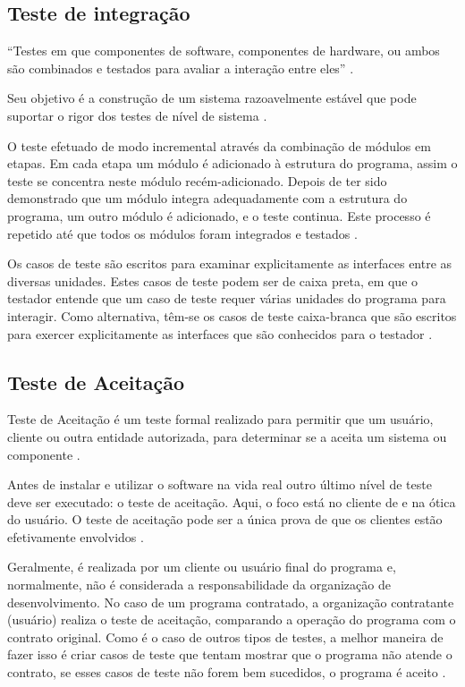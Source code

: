 \subsection{Teste de integração}

“Testes em que componentes de software, componentes de hardware, ou ambos são combinados e testados para avaliar a interação entre eles” \cite{ieee}.

Seu objetivo é a construção de um sistema razoavelmente estável que pode suportar o rigor dos testes de nível de sistema \cite[pág.~18]{naik2008}.

O teste  efetuado de modo incremental através da combinação de módulos em etapas. Em cada etapa um módulo é adicionado à estrutura do programa, assim o teste se concentra neste módulo recém-adicionado. Depois de ter sido demonstrado que um módulo integra adequadamente com a estrutura do programa, um outro módulo é adicionado, e o teste continua. Este processo é repetido até que todos os módulos foram integrados e testados \cite[pág.~134]{lewis2009}.

Os casos de teste são escritos para examinar explicitamente as interfaces entre as diversas unidades. Estes casos de teste podem ser de caixa preta, em que o testador entende que um caso de teste requer várias unidades do programa para interagir. Como alternativa, têm-se os casos de teste caixa-branca que são escritos para exercer explicitamente as interfaces que são conhecidos para o testador \cite{williams2006}.

\subsection{Teste de Aceitação}

Teste de Aceitação é um teste formal realizado para permitir que um usuário, cliente ou outra entidade autorizada, para determinar se a aceita um sistema ou componente \cite{ieee}.

Antes de instalar e utilizar o software na vida real outro último nível de teste deve ser executado: o teste de aceitação. Aqui, o foco está no cliente de e na ótica do usuário. O teste de aceitação pode ser a única prova de que os clientes estão efetivamente envolvidos \cite[pág.~61]{spillner2014}.

Geralmente, é realizada por um cliente ou usuário final do programa e, normalmente, não é considerada a responsabilidade da organização de desenvolvimento. No caso de um programa contratado, a organização contratante (usuário) realiza o teste de aceitação, comparando a operação do programa com o contrato original. Como é o caso de outros tipos de testes, a melhor maneira de fazer isso é criar casos de teste que tentam mostrar que o programa não atende o contrato, se esses casos de teste não forem bem sucedidos, o programa é aceito \cite[pág.~104]{myers2004}.  

